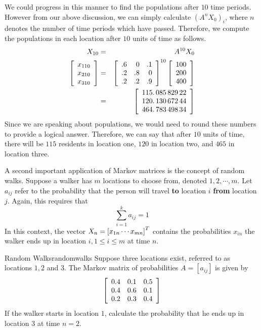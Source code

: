 \begin{solution}
We could progress in this manner to find the populations after $10$ time periods. However from our above discussion, we can simply calculate $\left( A^{n}X_0\right) _{i}$, 
where $n$ denotes the number of time periods which have passed. Therefore, we compute the populations in each location after $10$ units of time as follows. 
\begin{eqnarray*}
X_{10} &=& A^{10}X_0 \\
\left[ \begin{array}{r}
x_{1 10} \\
x_{2 10} \\
x_{3 10} 
\end{array}
\right] 
&=& 
\left[
\begin{array}{rrr}
.6 & 0 & .1 \\
.2 & .8 & 0 \\
.2 & .2 & .9
\end{array}
\right] ^{10}\left[
\begin{array}{r}
100 \\
200 \\
400
\end{array}
\right] \\
&=&  \left[
\begin{array}{c}
115.\,\allowbreak 085\,829\,22 \\
120.\,\allowbreak 130\,672\,44 \\
464.\,\allowbreak 783\,498\,34
\end{array}
\right]
\end{eqnarray*}
Since we are speaking about populations, we would need to round these numbers to provide a logical 
answer. Therefore, we can say that after $10$ units of time, there will be $115$ residents in location one, $120$ in location two,
and $465$ in location three.
\end{solution}

A second important application of Markov matrices is the concept of  random walks. Suppose a walker has $m$ locations to choose from, denoted $1, 2, \cdots, m$. Let $a_{ij}$ refer to the probability that the person will travel \textbf{to}  location $i$ \textbf{from} location $j$. Again, this requires that
\[
\sum_{i=1}^{k}a_{ij}=1
\]
In this context, the vector $X_n=\left[ x_{1n} \cdots x_{mn}\right] ^{T}$ contains the probabilities $x_{in}$ the walker ends up in location $i, 1\leq i \leq m$ at time $n$. 

\begin{example}{Random Walks}{randomwalks}
Suppose three locations exist, referred to as locations $1, 2$ and $3$. The Markov matrix of probabilities $A = [a_{ij}]$ is given by
\[
\left[
\begin{array}{rrr}
0.4 & 0.1 & 0.5 \\
0.4 & 0.6 & 0.1 \\
0.2 & 0.3 & 0.4
\end{array}
\right]
\]
If the walker starts in location $1$, calculate the probability that he ends up in location $3$ at time $n = 2$. 
\end{example}

